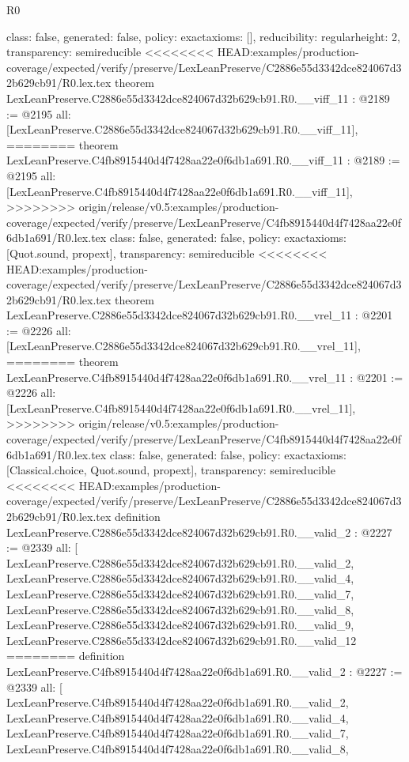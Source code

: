 \begin{lexlean}{R0}
\begin{coremodule}
{{{{{{{{{{{{{{{{{{{{{{{{{{{{{{{{{{{{{{{{{{  class: false,
  generated: false,
  policy: exact{axioms: []},
  reducibility: regular{height: 2},
  transparency: semireducible
}
<<<<<<<< HEAD:examples/production-coverage/expected/verify/preserve/LexLeanPreserve/C2886e55d3342dce824067d32b629cb91/R0.lex.tex
theorem LexLeanPreserve.C2886e55d3342dce824067d32b629cb91.R0.__viff_11 : @2189 := @2195 {
  all: [LexLeanPreserve.C2886e55d3342dce824067d32b629cb91.R0.__viff_11],
========
theorem LexLeanPreserve.C4fb8915440d4f7428aa22e0f6db1a691.R0.__viff_11 : @2189 := @2195 {
  all: [LexLeanPreserve.C4fb8915440d4f7428aa22e0f6db1a691.R0.__viff_11],
>>>>>>>> origin/release/v0.5:examples/production-coverage/expected/verify/preserve/LexLeanPreserve/C4fb8915440d4f7428aa22e0f6db1a691/R0.lex.tex
  class: false,
  generated: false,
  policy: exact{axioms: [Quot.sound, propext]},
  transparency: semireducible
}
<<<<<<<< HEAD:examples/production-coverage/expected/verify/preserve/LexLeanPreserve/C2886e55d3342dce824067d32b629cb91/R0.lex.tex
theorem LexLeanPreserve.C2886e55d3342dce824067d32b629cb91.R0.__vrel_11 : @2201 := @2226 {
  all: [LexLeanPreserve.C2886e55d3342dce824067d32b629cb91.R0.__vrel_11],
========
theorem LexLeanPreserve.C4fb8915440d4f7428aa22e0f6db1a691.R0.__vrel_11 : @2201 := @2226 {
  all: [LexLeanPreserve.C4fb8915440d4f7428aa22e0f6db1a691.R0.__vrel_11],
>>>>>>>> origin/release/v0.5:examples/production-coverage/expected/verify/preserve/LexLeanPreserve/C4fb8915440d4f7428aa22e0f6db1a691/R0.lex.tex
  class: false,
  generated: false,
  policy: exact{axioms: [Classical.choice, Quot.sound, propext]},
  transparency: semireducible
}
<<<<<<<< HEAD:examples/production-coverage/expected/verify/preserve/LexLeanPreserve/C2886e55d3342dce824067d32b629cb91/R0.lex.tex
definition LexLeanPreserve.C2886e55d3342dce824067d32b629cb91.R0.__valid_2 : @2227 := @2339 {
  all: [
    LexLeanPreserve.C2886e55d3342dce824067d32b629cb91.R0.__valid_2,
    LexLeanPreserve.C2886e55d3342dce824067d32b629cb91.R0.__valid_4,
    LexLeanPreserve.C2886e55d3342dce824067d32b629cb91.R0.__valid_7,
    LexLeanPreserve.C2886e55d3342dce824067d32b629cb91.R0.__valid_8,
    LexLeanPreserve.C2886e55d3342dce824067d32b629cb91.R0.__valid_9,
    LexLeanPreserve.C2886e55d3342dce824067d32b629cb91.R0.__valid_12
========
definition LexLeanPreserve.C4fb8915440d4f7428aa22e0f6db1a691.R0.__valid_2 : @2227 := @2339 {
  all: [
    LexLeanPreserve.C4fb8915440d4f7428aa22e0f6db1a691.R0.__valid_2,
    LexLeanPreserve.C4fb8915440d4f7428aa22e0f6db1a691.R0.__valid_4,
    LexLeanPreserve.C4fb8915440d4f7428aa22e0f6db1a691.R0.__valid_7,
    LexLeanPreserve.C4fb8915440d4f7428aa22e0f6db1a691.R0.__valid_8,
}}}}}}}}}}}}}}}}}}}}}}}}}}}}}}}}}}}}}}}}}}}}}
\end{coremodule}
\end{lexlean}
